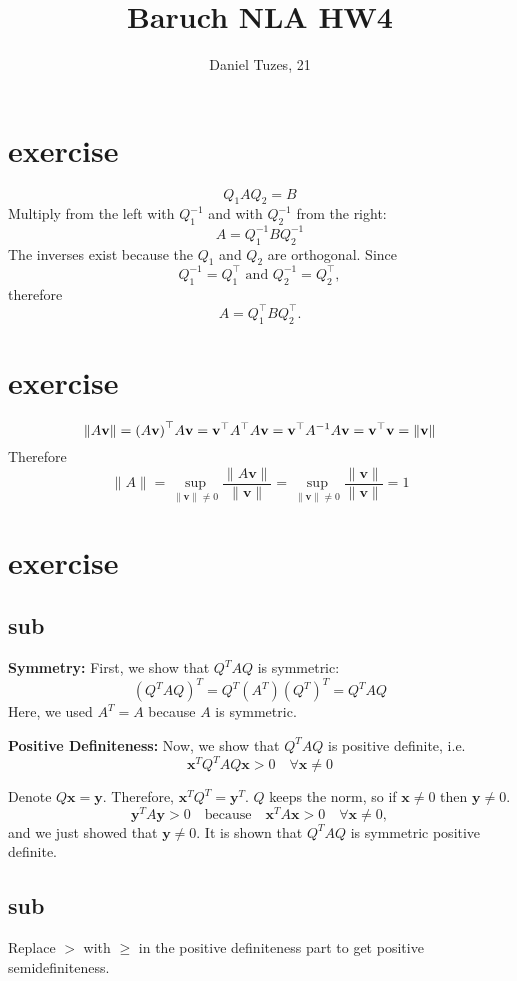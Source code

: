 \documentclass{article}
\title{Baruch NLA HW4}
\author{Daniel Tuzes, 21}
\begin{document}
\maketitle
\section{exercise}
\[
    Q_1 A Q_2 = B
\]
Multiply from the left with $Q_1^{-1}$ and with $Q_2^{-1}$ from the right:
\[
    A = Q_1^{-1} B Q_2^{-1}
\]
The inverses exist because the $Q_1$ and $Q_2$ are orthogonal. Since
\[
    Q_1^{-1} = Q_1^\top \text{ and } Q_2^{-1} = Q_2^\top,
\]
therefore
\[
    A = Q_1^\top B Q_2^\top.
\]
\section{exercise}
\[
    \left\| {A{\bf{v}}} \right\| = {\left( {A{\bf{v}}} \right)^\top}A{\bf{v}} = {{\bf{v}}^\top }{A^\top}A{\bf{v}} = {{\bf{v}}^\top}{A^{ - 1}}A{\bf{v}} = {{\bf{v}}^\top}{\bf{v}} = \left\| \bf{v} \right\|
\]
Therefore
\[
    \|A\| = \sup_{\|\mathbf{v}\| \neq 0} \frac{\|A \mathbf{v}\|}{\|\mathbf{v}\|}
    = \sup_{\|\mathbf{v}\| \neq 0} \frac{\|\mathbf{v}\|}{\|\mathbf{v}\|}
    = 1
\]
\section{exercise}
\subsection{sub}
\textbf{Symmetry:}
First, we show that \( Q^T A Q \) is symmetric:
\[
    (Q^T A Q)^T = Q^T (A^T) (Q^T)^T = Q^T A Q
\]
Here, we used \( A^T = A \) because \( A \) is symmetric.

\textbf{Positive Definiteness:}
Now, we show that \( Q^T A Q \) is positive definite, i.e.
\[
    \mathbf{x}^T Q^T A Q \mathbf{x} > 0 \quad \forall \mathbf{x} \neq 0
\]

Denote \(Q\mathbf{x}  = \mathbf{y} \). Therefore, \(\mathbf{x}^T Q^T = \mathbf{y}^T\). \(Q\) keeps the norm, so if \(\mathbf{x} \neq 0\) then \(\mathbf{y} \neq 0\).
\[
    \mathbf{y}^T A \mathbf{y} > 0 \quad \text{because} \quad \mathbf{x}^T A \mathbf{x} > 0 \quad \forall \mathbf{x} \neq 0,
\]
and we just showed that \(\mathbf{y} \neq 0\). It is shown that \( Q^T A Q \) is symmetric positive definite.
\subsection{sub}
Replace \(>\) with \(\geq\) in the positive definiteness part to get positive semidefiniteness.
\end{document}
